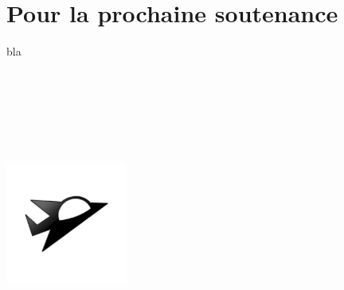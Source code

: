 \documentclass[10pt, titlepage]{report}
\begin{document}
\chapter{Pour la prochaine soutenance}


bla\\ \\ \\ \\ \\ \\ \\

\begin{center}
\includegraphics[height=4cm, width=4cm]{vaisseux_petit.png}
\end{center}
\end{document}
